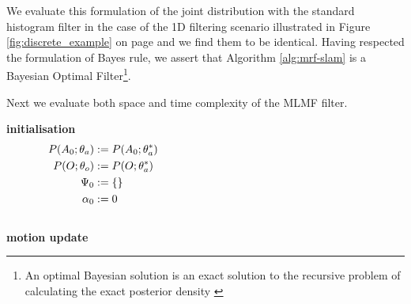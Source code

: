 We evaluate this formulation of the joint distribution with the standard histogram filter in the case of the 1D filtering scenario
illustrated in Figure \ref{fig:discrete_example} on page \pageref{fig:discrete_example} and we find them to be identical. Having respected the formulation of Bayes rule, we
assert that Algorithm \ref{alg:mrf-slam} is a Bayesian Optimal Filter\footnote{An optimal Bayesian solution is an exact solution to the recursive problem of calculating the exact posterior density 
\cite{PF_tutorial_2002}}.


Next we evaluate both space and time complexity of the MLMF filter.

\newpage
\begin{center}
\begin{minipage}{\linewidth}
\begin{algorithm}[H]
\label{alg:mrf-slam}
\nonl\hrulefill	
\BlankLine
\nonl\textbf{initialisation}\\
\vspace*{-0.5cm}
\nonl\begin{align}
P(A_0;\theta_a) &:= P(A_0;\theta^*_a) \hspace*{6.5cm} \nonumber \\
P(O;\theta_o) &:= P(O;\theta^*_a)\nonumber \\
\Psi_0 &:= \{\}\nonumber\\
\alpha_0 &:= 0 \nonumber
\end{align}
\vspace*{-1cm}
\BlankLine
\nonl\hrulefill	\\
\nonl\textbf{motion update}\\

\end{algorithm}
\end{minipage}
\end{center}
